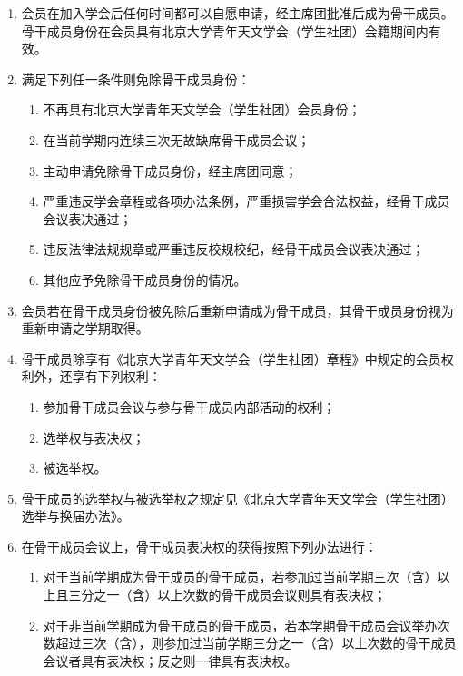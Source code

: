 \begin{enumerate}[resume]
    \item 会员在加入学会后任何时间都可以自愿申请，经主席团批准后成为骨干成员。骨干成员身份在会员具有北京大学青年天文学会（学生社团）会籍期间内有效。
    
    \item 满足下列任一条件则免除骨干成员身份：
    \begin{enumerate}
        \item 不再具有北京大学青年天文学会（学生社团）会员身份；
        \item 在当前学期内连续三次无故缺席骨干成员会议；
        \item 主动申请免除骨干成员身份，经主席团同意；
        \item 严重违反学会章程或各项办法条例，严重损害学会合法权益，经骨干成员会议表决通过；
        \item 违反法律法规规章或严重违反校规校纪，经骨干成员会议表决通过；
        \item 其他应予免除骨干成员身份的情况。
    \end{enumerate}

    \item 会员若在骨干成员身份被免除后重新申请成为骨干成员，其骨干成员身份视为重新申请之学期取得。
    
    \item 骨干成员除享有《北京大学青年天文学会（学生社团）章程》中规定的会员权利外，还享有下列权利：
    \begin{enumerate}
        \item 参加骨干成员会议与参与骨干成员内部活动的权利；
        \item 选举权与表决权；
        \item 被选举权。
    \end{enumerate}

    \item 骨干成员的选举权与被选举权之规定见《北京大学青年天文学会（学生社团）选举与换届办法》。
    
    \item 在骨干成员会议上，骨干成员表决权的获得按照下列办法进行：\label{item:right_for_vote}
    \begin{enumerate}
        \item 对于当前学期成为骨干成员的骨干成员，若参加过当前学期三次（含）以上且三分之一（含）以上次数的骨干成员会议则具有表决权；
        \item 对于非当前学期成为骨干成员的骨干成员，若本学期骨干成员会议举办次数超过三次（含），则参加过当前学期三分之一（含）以上次数的骨干成员会议者具有表决权；反之则一律具有表决权。
    \end{enumerate}


\end{enumerate}
